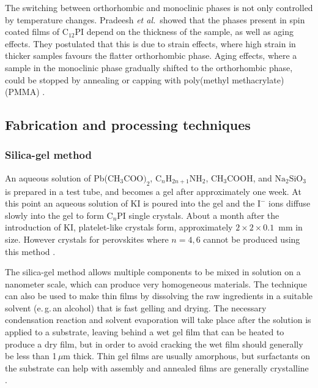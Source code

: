 The switching between orthorhombic and monoclinic phases is not only controlled by temperature changes. Pradeesh \textit{et al.}\ showed that the phases present in spin coated films of $\textrm{C}_{12}$PI depend on the thickness of the sample, as well as aging effects. They postulated that this is due to strain effects, where high strain in thicker samples favours the flatter orthorhombic phase. Aging effects, where a sample in the monoclinic phase gradually shifted to the orthorhombic phase, could be stopped by annealing or capping with poly(methyl methacrylate) (PMMA) \cite{Pradeesh2009}.

\subsection{Fabrication and processing techniques}
\subsubsection{Silica-gel method}
An aqueous solution of Pb($\textrm{CH}_3 \textrm{COO)}_2$, $\textrm{C}_n\textrm{H}_{2n+1}\textrm{NH}_2$, $\textrm{CH}_3$COOH, and $\textrm{Na}_2\textrm{SiO}_3$ is prepared in a test tube, and becomes a gel after approximately one week. At this point an aqueous solution of KI is poured into the gel and the $\textrm{I}^-$ ions diffuse slowly into the gel to form $\textrm{C}_n$PI single crystals. About a month after the introduction of KI, platelet-like crystals form, approximately $2\times 2\times 0.1$~mm in size. However crystals for perovskites where $n=4,6$ cannot be produced using this method \cite{Ishihara1990}.

The silica-gel method allows multiple components to be mixed in solution on a nanometer scale, which can produce very homogeneous materials. The technique can also be used to make thin films by dissolving the raw ingredients in a suitable solvent (e.\,g.\,an alcohol) that is fast gelling and drying. The necessary condensation reaction and solvent evaporation will take place after the solution is applied to a substrate, leaving behind a wet gel film that can be heated to produce a dry film, but in order to avoid cracking the wet film should generally be less than 1\,$\mu$m thick. Thin gel films are usually amorphous, but surfactants on the substrate can help with assembly and annealed films are generally crystalline \cite{Mitzi2001b}.

